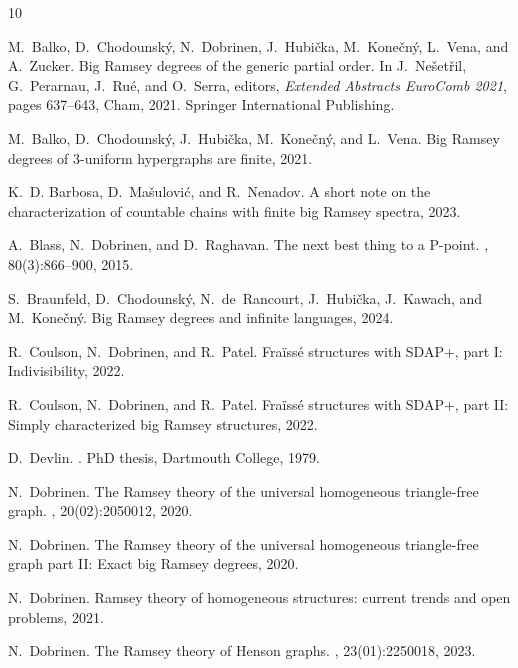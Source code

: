 \begin{thebibliography}{10}

M.~Balko, D.~Chodounsk{\'y}, N.~Dobrinen, J.~Hubi{\v{c}}ka,
  M.~Kone{\v{c}}n{\'y}, L.~Vena, and A.~Zucker.
\newblock Big {Ramsey} degrees of the generic partial order.
\newblock In J.~Ne{\v{s}}et{\v{r}}il, G.~Perarnau, J.~Ru{\'e}, and O.~Serra,
  editors, {\em Extended Abstracts EuroComb 2021}, pages 637--643, Cham, 2021.
  Springer International Publishing.

M.~Balko, D.~Chodounský, J.~Hubička, M.~Konečný, and L.~Vena.
\newblock Big {Ramsey} degrees of 3-uniform hypergraphs are finite, 2021.

K.~D. Barbosa, D.~Mašulović, and R.~Nenadov.
\newblock A short note on the characterization of countable chains with finite
  big {Ramsey} spectra, 2023.

A.~Blass, N.~Dobrinen, and D.~Raghavan.
\newblock The next best thing to a {P}-point.
, 80(3):866–900, 2015.

S.~Braunfeld, D.~Chodounský, N.~de~Rancourt, J.~Hubička, J.~Kawach, and
  M.~Konečný.
\newblock Big {Ramsey} degrees and infinite languages, 2024.

R.~Coulson, N.~Dobrinen, and R.~Patel.
\newblock Fra\"iss\'e structures with {SDAP}+, part {I}: Indivisibility, 2022.

R.~Coulson, N.~Dobrinen, and R.~Patel.
\newblock Fra\"iss\'e structures with {SDAP}+, part {II}: Simply characterized
  big {Ramsey} structures, 2022.

D.~Devlin.
.
\newblock PhD thesis, Dartmouth College, 1979.

N.~Dobrinen.
\newblock The {R}amsey theory of the universal homogeneous triangle-free graph.
, 20(02):2050012, 2020.

N.~Dobrinen.
\newblock The {Ramsey} theory of the universal homogeneous triangle-free graph
  part {II}: Exact big {Ramsey} degrees, 2020.

N.~Dobrinen.
\newblock Ramsey theory of homogeneous structures: current trends and open
  problems, 2021.

N.~Dobrinen.
\newblock The {R}amsey theory of {H}enson graphs.
, 23(01):2250018, 2023.


\end{thebibliography}
